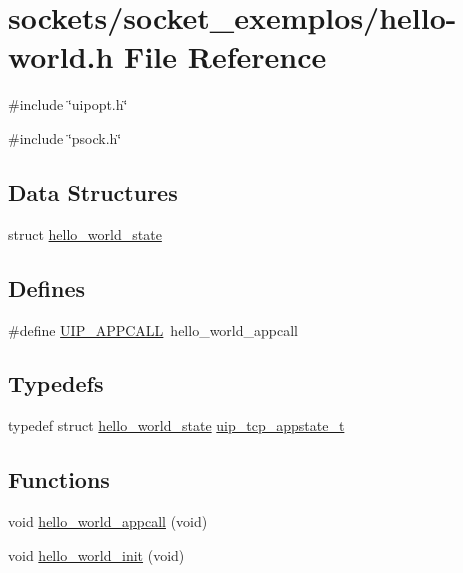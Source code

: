 \hypertarget{socket__exemplos_2hello-world_8h}{
\section{sockets/socket\_\-exemplos/hello-\/world.h File Reference}
\label{socket__exemplos_2hello-world_8h}
}
{\ttfamily \#include \char`\"{}uipopt.h\char`\"{}}\par
{\ttfamily \#include \char`\"{}psock.h\char`\"{}}\par
\subsection*{Data Structures}
\begin{DoxyCompactItemize}
\item 
struct \hyperlink{structhello__world__state}{hello\_\-world\_\-state}
\end{DoxyCompactItemize}
\subsection*{Defines}
\begin{DoxyCompactItemize}
\item 
\#define \hyperlink{socket__exemplos_2hello-world_8h_ae28f6cb60e86088d8886d0f804b4f37c}{UIP\_\-APPCALL}~hello\_\-world\_\-appcall
\end{DoxyCompactItemize}
\subsection*{Typedefs}
\begin{DoxyCompactItemize}
\item 
typedef struct \hyperlink{structhello__world__state}{hello\_\-world\_\-state} \hyperlink{socket__exemplos_2hello-world_8h_a59fa408ba4e2508c633c2484aafae8a1}{uip\_\-tcp\_\-appstate\_\-t}
\end{DoxyCompactItemize}
\subsection*{Functions}
\begin{DoxyCompactItemize}
\item 
void \hyperlink{group__helloworld_ga03070adbf8faab0f34f87c1270964306}{hello\_\-world\_\-appcall} (void)
\item 
void \hyperlink{group__helloworld_gab97849f0d3ea858eee790b69591e6427}{hello\_\-world\_\-init} (void)
\end{DoxyCompactItemize}
